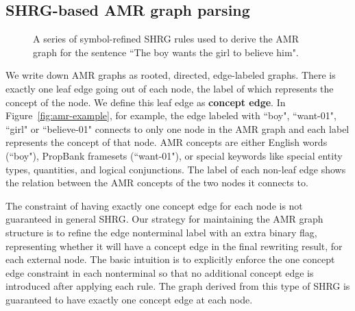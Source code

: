 \subsection{SHRG-based AMR graph parsing}
\begin{figure}
\begin{center}
\caption{A series of symbol-refined SHRG rules used to derive the AMR graph for the sentence ``The boy wants the girl to believe him".}
\label{fig:shrg-example}
\vspace{-1em}
\end{center}
\end{figure}
We write down AMR graphs as rooted, directed, edge-labeled graphs. There is exactly one leaf edge 
going out of each node, the label of which represents the concept of the node. We define
this leaf edge as {\bf concept edge}. In Figure~\ref{fig:amr-example}, for example, the edge labeled 
with ``boy", ``want-01", ``girl" or ``believe-01" connects to only one node in the AMR graph and
each label represents the concept of that node.
AMR concepts are either English words (``boy"), PropBank framesets (``want-01"), or special keywords like
special entity types, quantities, and logical conjunctions. The label of each non-leaf edge shows the relation
between the AMR concepts of the two nodes it connects to. %


The constraint of having exactly one concept edge for each node 
is not guaranteed in general SHRG\@. Our strategy for maintaining the AMR graph structure is to refine the 
edge nonterminal label with an extra binary
flag, representing whether it will have a concept edge in the
final rewriting result, for each external node. The basic intuition is to explicitly enforce the one concept edge constraint
in each nonterminal so that no additional concept edge is introduced after applying each rule. The graph
derived from this type of SHRG is guaranteed to have exactly one concept edge at each node.


